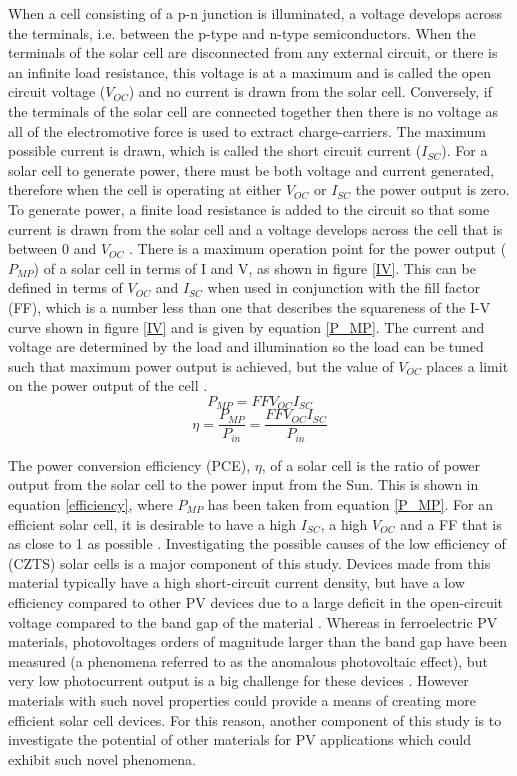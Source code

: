 When a cell consisting of a p-n junction is illuminated, a voltage develops across the terminals, i.e. between the p-type and n-type semiconductors. When the terminals of the solar cell are disconnected from any external circuit, or there is an infinite load resistance, this voltage is at a maximum and is called the open circuit voltage ($V_{OC}$) and no current is drawn from the solar cell. Conversely, if the terminals of the solar cell are connected together then there is no voltage as all of the electromotive force is used to extract charge-carriers. The maximum possible current is drawn, which is called the short circuit current ($I_{SC}$). For a solar cell to generate power, there must be both voltage and current generated, therefore when the cell is operating at either $V_{OC}$ or $I_{SC}$ the power output is zero. To generate power, a finite load resistance is added to the circuit so that some current is drawn from the solar cell and a voltage develops across the cell that is between 0 and $V_{OC}$ \cite{Nelson1}. There is a maximum operation point for the power output ($P_{MP}$) of a solar cell in terms of I and V, as shown in figure \ref{IV}. This can be defined in terms of $V_{OC}$ and $I_{SC}$ when used in conjunction with the fill factor (FF), which is a number less than one that describes the squareness of the I-V curve \cite{handbook} shown in figure \ref{IV} and is given by equation \ref{P_MP}. The current and voltage are determined by the load and illumination so the load can be tuned such that maximum power output is achieved, but the value of $V_{OC}$ places a limit on the power output of the cell \cite{Nelson1}.
\begin{equation} \label{P_MP}
P_{MP} = FFV_{OC}I_{SC}
\end{equation}
\begin{equation} \label{efficiency}
\eta = \frac{P_{MP}}{P_{in}} = \frac{FFV_{OC}I_{SC}}{P_{in}}
\end{equation}

The power conversion efficiency (PCE), $\eta$, of a solar cell is the ratio of power output from the solar cell to the power input from the Sun. This is shown in equation \ref{efficiency}, where $P_{MP}$ has been taken from equation \ref{P_MP}.
For an efficient solar cell, it is desirable to have a high $I_{SC}$, a high $V_{OC}$ and a FF that is as close to 1 as possible \cite{handbook}. Investigating the possible causes of the low efficiency of {\CZTS} (CZTS) solar cells is a major component of this study. Devices made from this material typically have a high short-circuit current density, but have a low efficiency compared to other PV devices due to a large deficit in the open-circuit voltage compared to the band gap of the material \cite{band_tailing_new}.
Whereas in ferroelectric PV materials, photovoltages orders of magnitude larger than the band gap have been measured (a phenomena referred to as the anomalous photovoltaic effect), but very low photocurrent output is a big challenge for these devices \cite{FE_PV_rev1}. However materials with such novel properties could provide a means of creating more efficient solar cell devices. For this reason, another component of this study is to investigate the potential of other materials for PV applications which could exhibit such novel phenomena.


